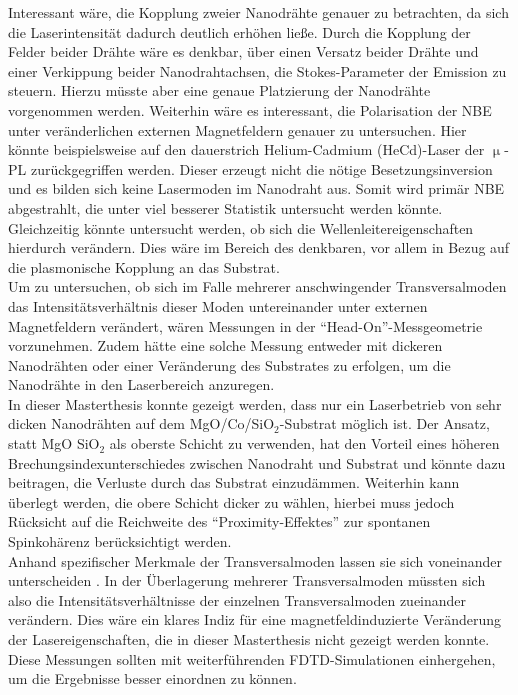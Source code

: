 Interessant wäre, die Kopplung zweier Nanodrähte genauer zu betrachten, da sich die Laserintensität dadurch deutlich erhöhen ließe. Durch die Kopplung der Felder beider Drähte wäre es denkbar, über einen Versatz beider Drähte und einer Verkippung beider Nanodrahtachsen, die Stokes-Parameter der Emission zu steuern. Hierzu müsste aber eine genaue Platzierung der Nanodrähte vorgenommen werden. Weiterhin wäre es interessant, die Polarisation der NBE unter veränderlichen externen Magnetfeldern genauer zu untersuchen. Hier könnte beispielsweise auf den dauerstrich Helium-Cadmium (HeCd)-Laser  der $\upmu$-PL zurückgegriffen werden. Dieser erzeugt nicht die nötige Besetzungsinversion und es bilden sich keine Lasermoden im Nanodraht aus. Somit wird primär NBE abgestrahlt, die unter viel besserer Statistik untersucht werden könnte. Gleichzeitig könnte untersucht werden, ob sich die Wellenleitereigenschaften hierdurch verändern. Dies wäre im Bereich des denkbaren, vor allem in Bezug auf die plasmonische Kopplung an das Substrat.\\
Um zu untersuchen, ob sich im Falle mehrerer anschwingender Transversalmoden das Intensitätsverhältnis dieser Moden untereinander unter externen Magnetfeldern verändert, wären Messungen in der ``Head-On''-Messgeometrie vorzunehmen. Zudem hätte eine solche Messung entweder mit dickeren Nanodrähten oder einer Veränderung des Substrates zu erfolgen, um die Nanodrähte in den Laserbereich anzuregen.\\
In dieser Masterthesis konnte gezeigt werden, dass nur ein Laserbetrieb von sehr dicken Nanodrähten auf dem MgO/Co/SiO$_\text{2}$-Substrat möglich ist. Der Ansatz, statt MgO SiO$_\text{2}$ als oberste Schicht zu verwenden, hat den Vorteil eines höheren Brechungsindexunterschiedes zwischen Nanodraht und Substrat und könnte dazu beitragen, die Verluste durch das Substrat einzudämmen. Weiterhin kann überlegt werden, die obere Schicht dicker zu wählen, hierbei muss jedoch Rücksicht auf die Reichweite des ``Proximity-Effektes'' zur spontanen Spinkohärenz berücksichtigt werden.\\
Anhand spezifischer Merkmale der Transversalmoden lassen sie sich voneinander unterscheiden \cite{Roeder.Diss}. In der Überlagerung mehrerer Transversalmoden müssten sich also die Intensitätsverhältnisse der einzelnen Transversalmoden zueinander verändern. Dies wäre ein klares Indiz für eine magnetfeldinduzierte Veränderung der Lasereigenschaften, die in dieser Masterthesis nicht gezeigt werden konnte. Diese Messungen sollten mit weiterführenden FDTD-Simulationen einhergehen, um die Ergebnisse besser einordnen zu können.